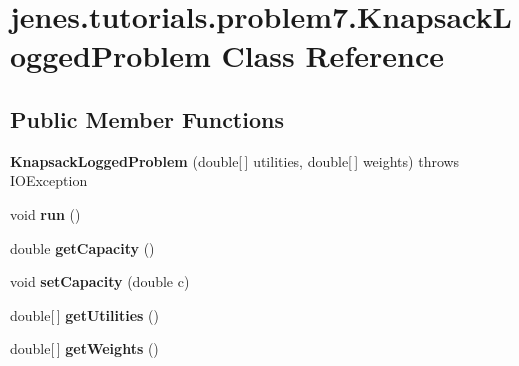 \hypertarget{classjenes_1_1tutorials_1_1problem7_1_1_knapsack_logged_problem}{\section{jenes.\-tutorials.\-problem7.\-Knapsack\-Logged\-Problem Class Reference}
\label{classjenes_1_1tutorials_1_1problem7_1_1_knapsack_logged_problem}
}
\subsection*{Public Member Functions}
\begin{DoxyCompactItemize}
\item 
\hypertarget{classjenes_1_1tutorials_1_1problem7_1_1_knapsack_logged_problem_a0ab9bce9861fb1a721cb682910fec3dc}{{\bfseries Knapsack\-Logged\-Problem} (double\mbox{[}$\,$\mbox{]} utilities, double\mbox{[}$\,$\mbox{]} weights)  throws I\-O\-Exception }\label{classjenes_1_1tutorials_1_1problem7_1_1_knapsack_logged_problem_a0ab9bce9861fb1a721cb682910fec3dc}

\item 
\hypertarget{classjenes_1_1tutorials_1_1problem7_1_1_knapsack_logged_problem_a433dd1c6435246eec5fdead858ef3237}{void {\bfseries run} ()}\label{classjenes_1_1tutorials_1_1problem7_1_1_knapsack_logged_problem_a433dd1c6435246eec5fdead858ef3237}

\item 
\hypertarget{classjenes_1_1tutorials_1_1problem7_1_1_knapsack_logged_problem_adac9e9311a429d0c41e8d4c9d7a1afb6}{double {\bfseries get\-Capacity} ()}\label{classjenes_1_1tutorials_1_1problem7_1_1_knapsack_logged_problem_adac9e9311a429d0c41e8d4c9d7a1afb6}

\item 
\hypertarget{classjenes_1_1tutorials_1_1problem7_1_1_knapsack_logged_problem_a7aad6283e4dcd58ee08550a6682c747d}{void {\bfseries set\-Capacity} (double c)}\label{classjenes_1_1tutorials_1_1problem7_1_1_knapsack_logged_problem_a7aad6283e4dcd58ee08550a6682c747d}

\item 
\hypertarget{classjenes_1_1tutorials_1_1problem7_1_1_knapsack_logged_problem_aa5a5916fe82cdf200e5f9210d673dc35}{double\mbox{[}$\,$\mbox{]} {\bfseries get\-Utilities} ()}\label{classjenes_1_1tutorials_1_1problem7_1_1_knapsack_logged_problem_aa5a5916fe82cdf200e5f9210d673dc35}

\item 
\hypertarget{classjenes_1_1tutorials_1_1problem7_1_1_knapsack_logged_problem_a23b4289088720e543640ae4f1743a129}{double\mbox{[}$\,$\mbox{]} {\bfseries get\-Weights} ()}\label{classjenes_1_1tutorials_1_1problem7_1_1_knapsack_logged_problem_a23b4289088720e543640ae4f1743a129}

\end{DoxyCompactItemize}

